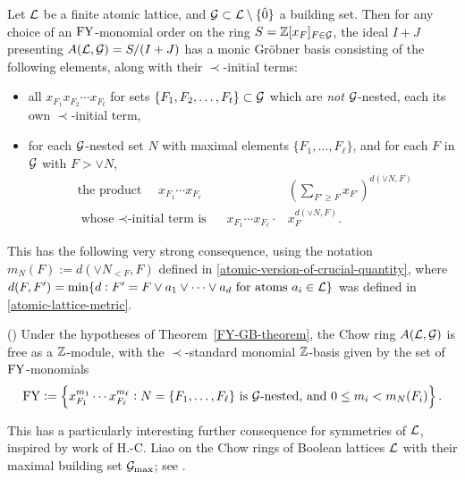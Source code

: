 \begin{thm}
\label{FY-GB-theorem}
Let $\mathcal{L}$ be a finite atomic lattice, and $\mathcal{G} \subset \mathcal{L} \setminus \{\hat{0}\}$ a building set.
Then for any choice of an $\mathrm{FY}$-monomial order on the ring $S=\mathbb{Z}[x_F]_{F\in \mathcal{G}}$,
the ideal $I+J$ presenting  $A(\mathcal{L}, \mathcal{G})=S/(I+J)$
has a monic Gr\"obner basis consisting of the following
elements, along with their $\prec$-initial terms:
\begin{itemize}
\item
all $x_{F_1} x_{F_2} \cdots x_{F_t}$ for sets $\{F_1,F_2,\ldots,F_t\} \subset \mathcal{G}$ which are {\it not} $\mathcal{G}$-nested, each its own $\prec$-initial term,
\item 
for each $\mathcal{G}$-nested set $N$ with maximal elements
$\{F_1,\ldots,F_\ell\}$, and for each $F$ in $\mathcal{G}$ with $F > \vee N$,
\begin{align*}
\text{ the product }\quad x_{F_1} \cdots x_{F_\ell} 
&\left( \sum_{F' \geq F} x_{F'} \right)^
{d(\vee N, F)}\\
\text{ whose $\prec$-initial term is }\quad  
x_{F_1} \cdots x_{F_\ell} \cdot  &x_F^
{d(\vee N, F)}.
\end{align*}
\end{itemize}
\end{thm}

This has the following very strong consequence,
using the notation $m_N(F):=d(\vee N_{<F}, F)$ defined in \eqref{atomic-version-of-crucial-quantity}, where
$d(F,F')=\min\{d:F'=F \vee a_1 \vee \cdots \vee a_d \text{ for atoms }a_i \in \mathcal{L}\}$ was
defined in \eqref{atomic-lattice-metric}.


\begin{cor} (\cite[Cor. 1]{FY}) 
\label{cor: mon_basis}
Under the hypotheses of Theorem~\ref{FY-GB-theorem},
the Chow ring $A(\mathcal{L},\mathcal{G})$ is free as a $\mathbb{Z}$-module, with
the $\prec$-standard monomial $\mathbb{Z}$-basis given by the set of $\mathrm{FY}$-monomials
\begin{equation}
\label{FY-monomials-definition}
\mathrm{FY} := \left\{ x_{F_1}^{m_1} \cdots x_{F_\ell}^{m_\ell}: 
N=\{F_1,\ldots,F_\ell\} \text{ is }\mathcal{G}\text{-nested, and }0 \leq m_i <m_N(F_i)\right\}.
\end{equation}
\end{cor}

This has a particularly interesting further consequence for symmetries of $\mathcal{L}$,
inspired by work of H.-C. Liao on the Chow rings of Boolean lattices $\mathcal{L}$
with their maximal building set $\mathcal{G}_{\max}$; see \cite[Thm. 3.6]{Liao_new}.

